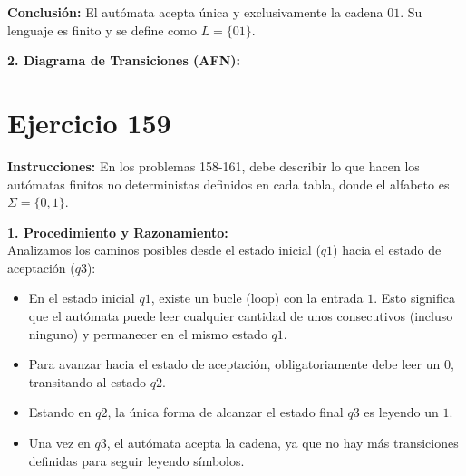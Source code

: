 \documentclass[12pt]{article}
\begin{document}
\vspace{0.3cm}
\textbf{Conclusión:} El autómata acepta única y exclusivamente la cadena $01$. Su lenguaje es finito y se define como $L = \{01\}$.

\vspace{0.5cm}

\textbf{2. Diagrama de Transiciones (AFN):}

\begin{center}
\end{center}

\section*{Ejercicio 159}

\textbf{Instrucciones:} En los problemas 158-161, debe describir lo que hacen los autómatas finitos no deterministas definidos en cada tabla, donde el alfabeto es $\Sigma=\{0,1\}$.

\vspace{0.5cm}

\textbf{1. Procedimiento y Razonamiento:} \\
Analizamos los caminos posibles desde el estado inicial ($q1$) hacia el estado de aceptación ($q3$):
\begin{itemize}
    \item En el estado inicial $q1$, existe un bucle (loop) con la entrada $1$. Esto significa que el autómata puede leer cualquier cantidad de unos consecutivos (incluso ninguno) y permanecer en el mismo estado $q1$.
    \item Para avanzar hacia el estado de aceptación, obligatoriamente debe leer un $0$, transitando al estado $q2$.
    \item Estando en $q2$, la única forma de alcanzar el estado final $q3$ es leyendo un $1$.
    \item Una vez en $q3$, el autómata acepta la cadena, ya que no hay más transiciones definidas para seguir leyendo símbolos.
\end{itemize}
\end{document}
